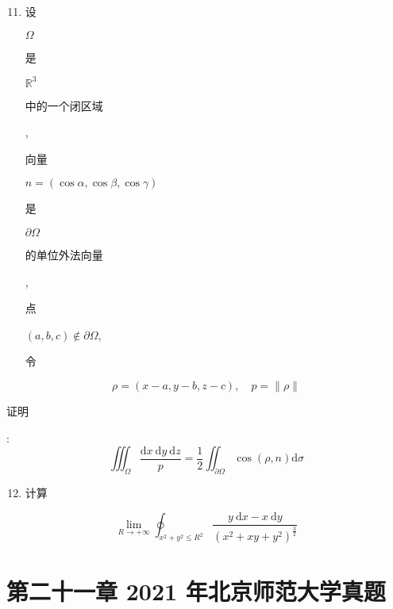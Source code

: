\documentclass[10pt]{article}
\begin{document}
\begin{enumerate}
  \setcounter{enumi}{10}
  \item \begin{CJK}{UTF8}{mj}设\end{CJK} $\Omega$ \begin{CJK}{UTF8}{mj}是\end{CJK} $\mathbb{R}^{3}$ \begin{CJK}{UTF8}{mj}中的一个闭区域\end{CJK}, \begin{CJK}{UTF8}{mj}向量\end{CJK} $n=(\cos \alpha, \cos \beta, \cos \gamma)$ \begin{CJK}{UTF8}{mj}是\end{CJK} $\partial \Omega$ \begin{CJK}{UTF8}{mj}的单位外法向量\end{CJK}, \begin{CJK}{UTF8}{mj}点\end{CJK} $(a, b, c) \notin \partial \Omega$, \begin{CJK}{UTF8}{mj}令\end{CJK}
\end{enumerate}
$$
\rho=(x-a, y-b, z-c), \quad p=\|\rho\|
$$
\begin{CJK}{UTF8}{mj}证明\end{CJK}:
$$
\iiint_{\Omega} \frac{\mathrm{d} x \mathrm{~d} y \mathrm{~d} z}{p}=\frac{1}{2} \iint_{\partial \Omega} \cos (\rho, n) \mathrm{d} \sigma
$$

\begin{enumerate}
  \setcounter{enumi}{11}
  \item \begin{CJK}{UTF8}{mj}计算\end{CJK}
\end{enumerate}
$$
\lim _{R \rightarrow+\infty} \oint_{x^{2}+y^{2} \leq R^{2}} \frac{y \mathrm{~d} x-x \mathrm{~d} y}{\left(x^{2}+x y+y^{2}\right)^{\frac{3}{2}}}
$$

\section{第二十一章 2021 年北京师范大学真题}
\end{document}
